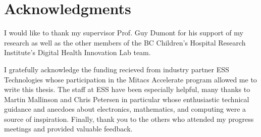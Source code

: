 
\chapter{Acknowledgments}

I would like to thank my supervisor Prof. Guy Dumont for his support of my research as well as the other members of the BC Children's Hospital Research Institute's Digital Health Innovation Lab team.

I gratefully acknowledge the funding recieved from industry partner ESS Technologies whose participation in the Mitacs Accelerate program allowed me to write this thesis. The staff at ESS have been especially helpful, many thanks to Martin Mallinson and Chris Petersen in particular whose enthusiastic technical guidance and anecdoes about electronics, mathematics, and computing were a source of inspiration. Finally, thank you to the others who attended my progress meetings and provided valuable feedback.
